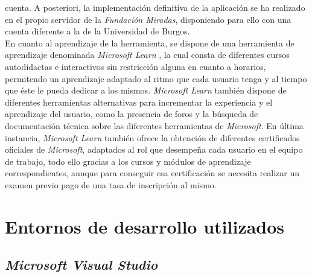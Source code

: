 cuenta. A posteriori, la implementación definitiva de la aplicación se ha
realizado en el propio servidor de la \textit{Fundación Miradas}, disponiendo
para ello con una cuenta diferente a la de la Universidad de Burgos. \\
En cuanto al aprendizaje de la herramienta, se dispone de una herramienta de
aprendizaje denominada \textit{Microsoft Learn} \cite{MicrosoftLearn}, la cual
consta de diferentes cursos autodidactas e interactivos sin restricción alguna
en cuanto a horarios, permitendo un aprendizaje adaptado al ritmo que cada
usuario tenga y al tiempo que éste le pueda dedicar a los mismos.
\textit{Microsoft Learn} también dispone de diferentes herramientas alternativas
para incrementar la experiencia y el aprendizaje del usuario, como la presencia
de foros y la búsqueda de documentación técnica sobre las diferentes
herramientas de \textit{Microsoft}. En última instancia, \textit{Microsoft
Learn} también ofrece la obtención de diferentes certificados oficiales de
\textit{Microsoft}, adaptados al rol que desempeña cada usuario en el equipo de
trabajo, todo ello gracias a los cursos y módulos de aprendizaje
correspondientes, aunque para conseguir esa certificación se necesita realizar
un examen previo pago de una tasa de inscripción al mismo.



\section{Entornos de desarrollo utilizados}
\subsection{\textit{Microsoft Visual Studio}} 


